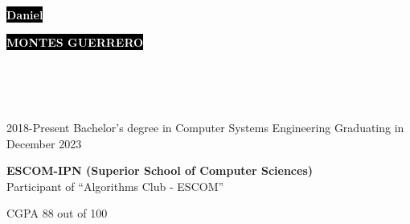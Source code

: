 \documentclass[9pt]{developercv} %
\begin{document}

\begin{minipage}[t]{0.70\textwidth} %
	\vspace{-\baselineskip} %
	
	\colorbox{black}{{\HUGE\textcolor{white}{\textbf{{Daniel}}}}} %
	
	\colorbox{black}{{\HUGE\textcolor{white}{\textbf{{MONTES GUERRERO}}}}} %
	
	\vspace{6pt}
\end{minipage}
\begin{minipage}[t]{0.3\textwidth} %
	\vspace{-\baselineskip} %
	
	\\
	\\
	\\
\end{minipage}



\begin{entrylist}
	\entry
		{2018-Present}
		{Bachelor’s degree in Computer Systems Engineering}
		{Graduating in December 2023}
		{\textbf{ESCOM-IPN (Superior School of Computer Sciences)}\\
		Participant of ``Algorithms Club - ESCOM''
		 \begin{flushright}
		 	CGPA 88 out of 100
		 \end{flushright}
		}
\end{entrylist}
\end{document}
